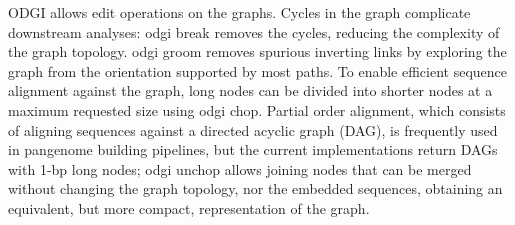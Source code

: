 \documentclass{bioinfo}
\begin{document}
\begin{comment}


Table 1 - A selection of the tools available in ODGI
Name
Description
For conversion


build
Convert graphs from GFA to ODGI format.
view
Convert graphs from ODGI to GFA format.
For validation


validate
Check if the graph is consistent.
For interrogation


stats
Return graph metrics.
bin
Summarize path information in bins of fixed size.
depth
Return node depth as defined by query criteria.
degree
Return node degree as defined by query criteria.
For manipulation


break
Break cycles in the graph, reducing its complexity.
groom
Resolve spurious inverting links.
chop
Chop long nodes into short ones while preserving graph topology and node order.
unchop
Join nodes that can be merged without changing the graph topology, nor the embedded sequences.
explode
Separate the graph into the connected components.
squeeze
Squeeze multiple graphs into the same file, preventing node ID collisions.
extract
Extract parts of the graph as defined by query criteria.
For coordinate projections


position
Coordinate projections between nodes and paths in different graphs.
For visualization


viz
Visualize the graph in one dimension.
sort
Sort the graph.
layout
Generate two-dimension graph layouts.
draw
Draw two-dimension layouts.

\end{comment}


ODGI allows edit operations on the graphs. Cycles in the graph complicate downstream analyses: odgi break removes the cycles, reducing the complexity of the graph topology. odgi groom removes spurious inverting links by exploring the graph from the orientation supported by most paths. To enable efficient sequence alignment against the graph, long nodes can be divided into shorter nodes at a maximum requested size using odgi chop. Partial order alignment, which consists of aligning sequences against a directed acyclic graph (DAG), is frequently used in pangenome building pipelines, but the current implementations return DAGs with 1-bp long nodes; odgi unchop allows joining nodes that can be merged without changing the graph topology, nor the embedded sequences, obtaining an equivalent, but more compact, representation of the graph.
\end{document}
